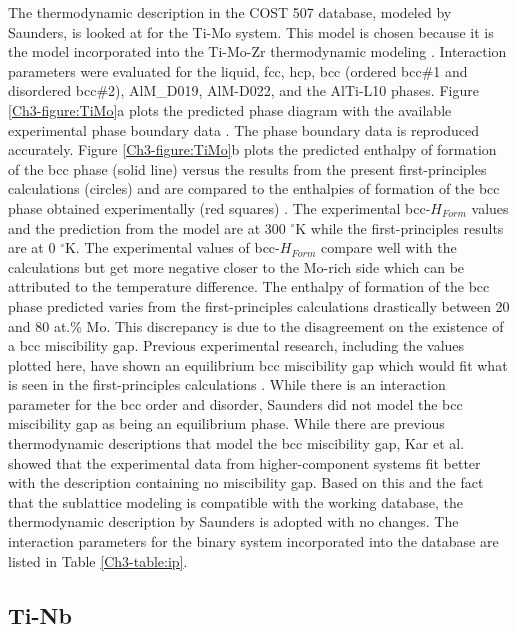 The thermodynamic description in the COST 507 database, modeled by Saunders, \cite{Ansara1998} is looked at for the Ti-Mo system. This model is chosen because it is the model incorporated into the Ti-Mo-Zr thermodynamic modeling \cite{Kar2008}. Interaction parameters were evaluated for the liquid, fcc, hcp, bcc (ordered bcc\#1 and disordered bcc\#2), AlM\_D019, AlM-D022, and the AlTi-L10 phases. Figure \ref{Ch3-figure:TiMo}a plots the predicted phase diagram \cite{Ansara1998} with the available experimental phase boundary data \cite{Murray1981}. The phase boundary data is reproduced accurately. Figure \ref{Ch3-figure:TiMo}b plots the predicted enthalpy of formation of the bcc phase (solid line) versus the results from the present first-principles calculations (circles) and are compared to the enthalpies of formation of the bcc phase obtained experimentally (red squares) \cite{Uesugi2013}. The experimental bcc-$H_{Form}$ values and the prediction from the model are at 300 $^{\circ}$K while the first-principles results are at 0 $^{\circ}$K. The experimental values of bcc-$H_{Form}$ compare well with the calculations but get more negative closer to the Mo-rich side which can be attributed to the temperature difference. The enthalpy of formation of the bcc phase predicted varies from the first-principles calculations drastically between 20 and 80 at.\% Mo. This discrepancy is due to the disagreement on the existence of a bcc miscibility gap. Previous experimental research, including the values plotted here, have shown an equilibrium bcc miscibility gap which would fit what is seen in the first-principles calculations \cite{Uesugi2013,Predel1997,Hoffman1967}. While there is an interaction parameter for the bcc order and disorder, Saunders \cite{Ansara1998} did not model the bcc miscibility gap as being an equilibrium phase. While there are previous thermodynamic descriptions that model the bcc miscibility gap, Kar et al. \cite{Kar2008} showed that the experimental data from higher-component systems fit better with the description containing no miscibility gap. Based on this and the fact that the sublattice modeling is compatible with the working database, the thermodynamic description by Saunders \cite{Ansara1998} is adopted with no changes. The interaction parameters for the binary system incorporated into the database are listed in Table \ref{Ch3-table:ip}.


\subsection{Ti-Nb}

